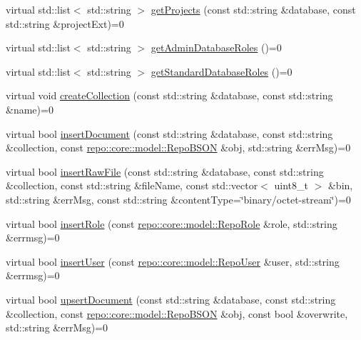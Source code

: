 \begin{DoxyCompactItemize}
\item 
virtual std\+::list$<$ std\+::string $>$ \hyperlink{classrepo_1_1core_1_1handler_1_1_abstract_database_handler_a1470a0e85e9b219d44567b38132e719d}{get\+Projects} (const std\+::string \&database, const std\+::string \&project\+Ext)=0
\item 
virtual std\+::list$<$ std\+::string $>$ \hyperlink{classrepo_1_1core_1_1handler_1_1_abstract_database_handler_a144930566b6a49042b2f17300716ec0f}{get\+Admin\+Database\+Roles} ()=0
\item 
virtual std\+::list$<$ std\+::string $>$ \hyperlink{classrepo_1_1core_1_1handler_1_1_abstract_database_handler_af626a68ca19507b2ff02b52cf1194110}{get\+Standard\+Database\+Roles} ()=0
\item 
virtual void \hyperlink{classrepo_1_1core_1_1handler_1_1_abstract_database_handler_a55a28fe47b164cb4578cb4e682759439}{create\+Collection} (const std\+::string \&database, const std\+::string \&name)=0
\item 
virtual bool \hyperlink{classrepo_1_1core_1_1handler_1_1_abstract_database_handler_a46cffb1fa82f8f5265727ed04cdbfe30}{insert\+Document} (const std\+::string \&database, const std\+::string \&collection, const \hyperlink{classrepo_1_1core_1_1model_1_1_repo_b_s_o_n}{repo\+::core\+::model\+::\+Repo\+B\+S\+O\+N} \&obj, std\+::string \&err\+Msg)=0
\item 
virtual bool \hyperlink{classrepo_1_1core_1_1handler_1_1_abstract_database_handler_a83ad94918c161f5511abab7cac99a5f2}{insert\+Raw\+File} (const std\+::string \&database, const std\+::string \&collection, const std\+::string \&file\+Name, const std\+::vector$<$ uint8\+\_\+t $>$ \&bin, std\+::string \&err\+Msg, const std\+::string \&content\+Type=\char`\"{}binary/octet-\/stream\char`\"{})=0
\item 
virtual bool \hyperlink{classrepo_1_1core_1_1handler_1_1_abstract_database_handler_a93ddebde4c94ca15d0146463e506d063}{insert\+Role} (const \hyperlink{classrepo_1_1core_1_1model_1_1_repo_role}{repo\+::core\+::model\+::\+Repo\+Role} \&role, std\+::string \&errmsg)=0
\item 
virtual bool \hyperlink{classrepo_1_1core_1_1handler_1_1_abstract_database_handler_a1264f8caf3b3e968632dca720002dab6}{insert\+User} (const \hyperlink{classrepo_1_1core_1_1model_1_1_repo_user}{repo\+::core\+::model\+::\+Repo\+User} \&user, std\+::string \&errmsg)=0
\item 
virtual bool \hyperlink{classrepo_1_1core_1_1handler_1_1_abstract_database_handler_a5387adf2593b59bdca51290270299b16}{upsert\+Document} (const std\+::string \&database, const std\+::string \&collection, const \hyperlink{classrepo_1_1core_1_1model_1_1_repo_b_s_o_n}{repo\+::core\+::model\+::\+Repo\+B\+S\+O\+N} \&obj, const bool \&overwrite, std\+::string \&err\+Msg)=0

\end{DoxyCompactItemize}
